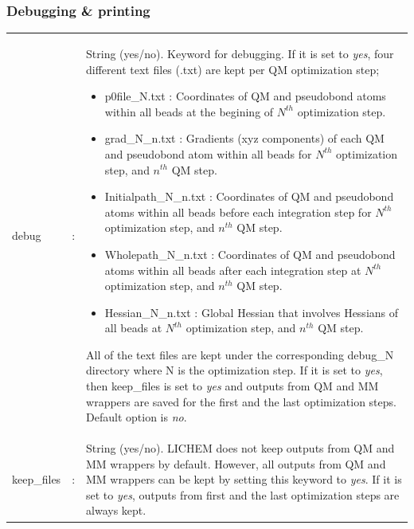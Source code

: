 \documentclass[12pt]{report}
\begin{document}
\subsubsection{Debugging \& printing}
\begin{center}
\begin{longtable}[c]{ p{4cm} c p{12.5cm}}
debug & : &
String (yes/no).
Keyword for debugging.
If it is set to \textsl{yes},
four different text files (\*.txt)
are kept per QM optimization step;\newline

\begin{itemize}
\item p0file\_N.txt : Coordinates of QM and
pseudobond atoms within all beads at the
begining of $N^{th}$ optimization step.
\item grad\_N\_n.txt : Gradients (xyz components)
of each QM and pseudobond atom within all beads
for $N^{th}$ optimization step, and $n^{th}$ QM step.
\item Initialpath\_N\_n.txt : Coordinates of QM and
pseudobond atoms within all beads before each integration
step for $N^{th}$ optimization step, and $n^{th}$ QM step.
\item Wholepath\_N\_n.txt : Coordinates of QM and
pseudobond atoms within all beads after each integration
step at $N^{th}$ optimization step, and $n^{th}$ QM step.
\item Hessian\_N\_n.txt : Global Hessian that involves
Hessians of all beads
at $N^{th}$ optimization step, and $n^{th}$ QM step.\newline
\end{itemize}
All of the text files are kept under
the corresponding debug\_N directory
where N is the optimization step.
If it is set to \textsl{yes},
then keep\_files
is set to \textsl{yes} and
outputs from QM and MM wrappers
are saved for the first and the last
optimization steps.
Default option is \textsl{no}.\newline\\

keep\_files & : &
String (yes/no).
LICHEM does not keep outputs
from QM and MM wrappers by default.
However, all outputs
from QM and MM wrappers can be
kept by setting this keyword
to \textsl{yes}.
If it is set to \textsl{yes},
outputs from first and the last
optimization steps are
always kept.\newline \\


\end{longtable}
\end{center}
\end{document}
